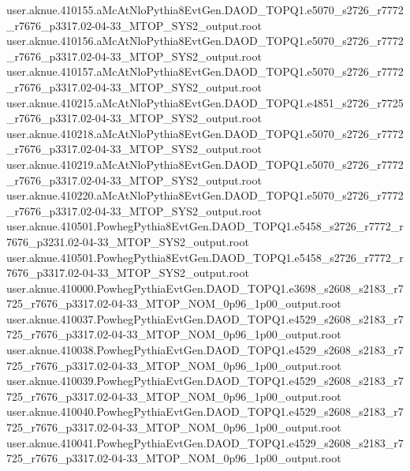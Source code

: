 {user.aknue.410155.aMcAtNloPythia8EvtGen.DAOD_TOPQ1.e5070_s2726_r7772_r7676_p3317.02-04-33_MTOP_SYS2_output.root\\
user.aknue.410156.aMcAtNloPythia8EvtGen.DAOD_TOPQ1.e5070_s2726_r7772_r7676_p3317.02-04-33_MTOP_SYS2_output.root\\
user.aknue.410157.aMcAtNloPythia8EvtGen.DAOD_TOPQ1.e5070_s2726_r7772_r7676_p3317.02-04-33_MTOP_SYS2_output.root\\
user.aknue.410215.aMcAtNloPythia8EvtGen.DAOD_TOPQ1.e4851_s2726_r7725_r7676_p3317.02-04-33_MTOP_SYS2_output.root\\
user.aknue.410218.aMcAtNloPythia8EvtGen.DAOD_TOPQ1.e5070_s2726_r7772_r7676_p3317.02-04-33_MTOP_SYS2_output.root\\
user.aknue.410219.aMcAtNloPythia8EvtGen.DAOD_TOPQ1.e5070_s2726_r7772_r7676_p3317.02-04-33_MTOP_SYS2_output.root\\
user.aknue.410220.aMcAtNloPythia8EvtGen.DAOD_TOPQ1.e5070_s2726_r7772_r7676_p3317.02-04-33_MTOP_SYS2_output.root\\
user.aknue.410501.PowhegPythia8EvtGen.DAOD_TOPQ1.e5458_s2726_r7772_r7676_p3231.02-04-33_MTOP_SYS2_output.root\\
user.aknue.410501.PowhegPythia8EvtGen.DAOD_TOPQ1.e5458_s2726_r7772_r7676_p3317.02-04-33_MTOP_SYS2_output.root\\



user.aknue.410000.PowhegPythiaEvtGen.DAOD_TOPQ1.e3698_s2608_s2183_r7725_r7676_p3317.02-04-33_MTOP_NOM_0p96_1p00_output.root\\
user.aknue.410037.PowhegPythiaEvtGen.DAOD_TOPQ1.e4529_s2608_s2183_r7725_r7676_p3317.02-04-33_MTOP_NOM_0p96_1p00_output.root\\
user.aknue.410038.PowhegPythiaEvtGen.DAOD_TOPQ1.e4529_s2608_s2183_r7725_r7676_p3317.02-04-33_MTOP_NOM_0p96_1p00_output.root\\
user.aknue.410039.PowhegPythiaEvtGen.DAOD_TOPQ1.e4529_s2608_s2183_r7725_r7676_p3317.02-04-33_MTOP_NOM_0p96_1p00_output.root\\
user.aknue.410040.PowhegPythiaEvtGen.DAOD_TOPQ1.e4529_s2608_s2183_r7725_r7676_p3317.02-04-33_MTOP_NOM_0p96_1p00_output.root\\
user.aknue.410041.PowhegPythiaEvtGen.DAOD_TOPQ1.e4529_s2608_s2183_r7725_r7676_p3317.02-04-33_MTOP_NOM_0p96_1p00_output.root\\

}
